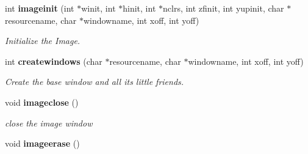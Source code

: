 \begin{CompactItemize}
\item 
int {\bf imageinit} (int $\ast$winit, int $\ast$hinit, int $\ast$nclrs, int zfinit, int yupinit, char $\ast$resourcename, char $\ast$windowname, int xoff, int yoff)
\begin{CompactList}\small\item\em Initialize the Image. \item\end{CompactList}\item 
int {\bf createwindows} (char $\ast$resourcename, char $\ast$windowname, int xoff, int yoff)
\begin{CompactList}\small\item\em Create the base window and all its little friends. \item\end{CompactList}\item 
void {\bf imageclose} ()\label{xtvutils_8c_a167}

\begin{CompactList}\small\item\em close the image window \item\end{CompactList}\item 
void {\bf imageerase} ()\label{xtvutils_8c_a168}


\end{CompactItemize}
